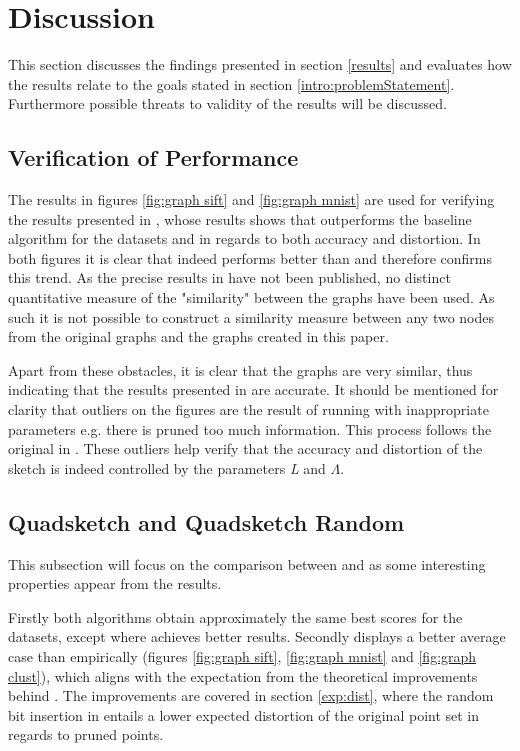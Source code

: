 \section{Discussion}
\label{discussion}
This section discusses the findings presented in section \ref{results} and evaluates how the results relate to the goals stated in section \ref{intro:problemStatement}. Furthermore possible threats to validity of the results will be discussed.

\subsection{Verification of Performance}
The results in figures \ref{fig:graph sift} and \ref{fig:graph mnist} are used for verifying the results presented in \cite{wagner17}, whose results shows that \qs{} outperforms the baseline \grid{} algorithm for the datasets \sift{} and \mnist{} in regards to both accuracy and distortion. In both figures it is clear that \qs{} indeed performs better than \grid{} and therefore confirms this trend. As the precise results in \cite{wagner17} have not been published, no distinct quantitative measure of the "similarity" between the graphs have been used. As such it is not possible to construct a similarity measure between any two nodes from the original graphs and the graphs created in this paper. 

Apart from these obstacles, it is clear that the graphs are very similar, thus indicating that the results presented in \cite{wagner17} are accurate. It should be mentioned for clarity that outliers on the figures are the result of running \qs{} with inappropriate parameters e.g. there is pruned too much information. This process follows the original in \cite{wagner17}. These outliers help verify that the accuracy and distortion of the sketch is indeed controlled by the parameters \textit{L} and $\Lambda$.  

\subsection{Quadsketch and Quadsketch Random}
This subsection will focus on the comparison between \qs{} and \qsr{} as some interesting properties appear from the results. 

Firstly both algorithms obtain approximately the same best scores for the datasets, except \mnist{} where \qsr{} achieves better results. Secondly \qsr{} displays a better average case than \qs{} empirically (figures \ref{fig:graph sift}, \ref{fig:graph mnist} and \ref{fig:graph clust}), which aligns with the expectation from the theoretical improvements behind \qsr{}. The improvements are covered in section \ref{exp:dist}, where the random bit insertion in \qsr{} entails a lower expected distortion of the original point set in regards to pruned points.

